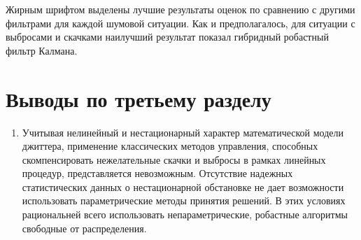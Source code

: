 Жирным шрифтом выделены лучшие результаты оценок по сравнению с другими фильтрами для каждой шумовой ситуации. Как и предполагалось, для ситуации с выбросами и скачками наилучший результат показал гибридный робастный фильтр Калмана.








\section{Выводы по третьему разделу} \label{sect:concl3}

\begin{enumerate}

 
 \item Учитывая нелинейный и нестационарный характер математической модели джиттера, 
 применение классических методов управления, способных скомпенсировать нежелательные скачки и выбросы в рамках линейных процедур, представляется невозможным.
 Отсутствие надежных статистических данных о нестационарной обстановке не дает возможности использовать параметрические методы принятия решений.
 В этих условиях рациональней всего использовать непараметрические, робастные алгоритмы свободные от распределения.
 
 

\end{enumerate}
